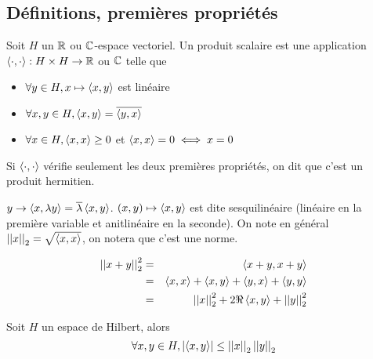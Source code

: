\subsection{Définitions, premières propriétés}

\begin{definition}
	Soit $H$ un $\mathbb{R}$ ou $\mathbb{C}$-espace vectoriel.
	Un produit scalaire est une application $\left\langle \cdot, \cdot \right\rangle : H \times H \to \mathbb{R}$ ou $\mathbb{C}$ telle que
	\begin{itemize}
		\item $\forall y \in H, x \mapsto \left\langle x, y \right\rangle$ est linéaire
		\item $\forall x,y \in H, \left\langle x, y \right\rangle = \overline{\left\langle y, x \right\rangle}$
		\item $\forall x \in H, \left\langle x, x \right\rangle \geq 0$ et $\left\langle x, x \right\rangle = 0 \iff x = 0$
	\end{itemize}

	Si $\left\langle \cdot, \cdot \right\rangle$ vérifie seulement les deux premières propriétés, on dit que c'est un produit hermitien.
\end{definition}

\begin{remarque}
	$ y \to \left\langle x, \lambda y \right\rangle = \overline{\lambda} \left\langle x, y \right\rangle $.
	$(x,y) \mapsto \left\langle x, y \right\rangle$ est dite sesquilinéaire (linéaire en la première variable et anitlinéaire en la seconde).
	On note en général $\left|\left|x\right|\right|_2 = \sqrt{\left\langle x, x \right\rangle}$, on notera que c'est une norme.
\end{remarque}

\begin{remarque}
	\begin{eqnarray*}
		\left|\left|x + y\right|\right|_2^2 &=& \left\langle x + y, x + y \right\rangle\\
		&=& \left\langle x, x \right\rangle + \left\langle x, y \right\rangle + \left\langle y, x \right\rangle + \left\langle y, y \right\rangle\\
		&=& \left|\left|x\right|\right|_2^2 + 2\Re \left\langle x, y \right\rangle + \left|\left|y\right|\right|_2^2
	\end{eqnarray*}
\end{remarque}

\begin{prop}
	Soit $H$ un espace de Hilbert, alors
	$$ \forall x,y \in H, \left|\left\langle x, y \right\rangle\right| \leq \left|\left|x\right|\right|_2 \left|\left|y\right|\right|_2 $$
\end{prop}

